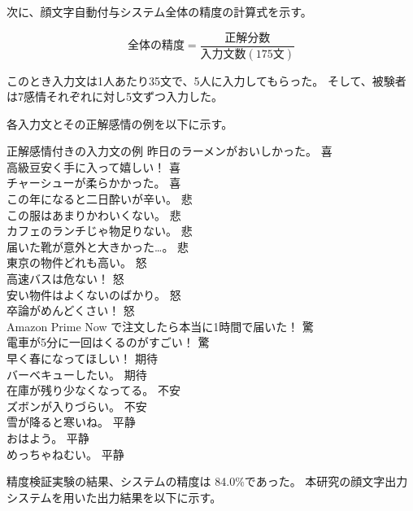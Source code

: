 \documentclass[11pt,a4j]{jsarticle}
\begin{document}
次に、顔文字自動付与システム全体の精度の計算式を示す。

\[
全体の精度=\frac{正解分数}{入力文数(175文)}
\]

このとき入力文は1人あたり35文で、5人に入力してもらった。
そして、被験者は7感情それぞれに対し5文ずつ入力した。

各入力文とその正解感情の例を以下に示す。

\begin{itembox}[l]{正解感情付きの入力文の例}
昨日のラーメンがおいしかった。 喜 \\
高級豆安く手に入って嬉しい！ 喜\\
チャーシューが柔らかかった。 喜\\
この年になると二日酔いが辛い。 悲\\
この服はあまりかわいくない。 悲\\
カフェのランチじゃ物足りない。 悲\\
届いた靴が意外と大きかった…。 悲\\
東京の物件どれも高い。 怒\\
高速バスは危ない！ 怒\\
安い物件はよくないのばかり。 怒\\
卒論がめんどくさい！ 怒\\
Amazon Prime Now で注文したら本当に1時間で届いた！ 驚\\
電車が5分に一回はくるのがすごい！ 驚\\
早く春になってほしい！ 期待\\
バーベキューしたい。 期待\\
在庫が残り少なくなってる。 不安\\
ズボンが入りづらい。 不安\\
雪が降ると寒いね。 平静\\
おはよう。 平静\\
めっちゃねむい。 平静\\
\end{itembox}

精度検証実験の結果、システムの精度は 84.0\%であった。
本研究の顔文字出力システムを用いた出力結果を以下に示す。
\end{document}
